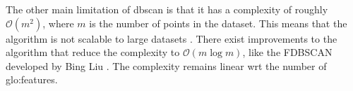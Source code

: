 The other main limitation of \gls{dbscan} is that it has a complexity of roughly $\mathcal{O}(m^2)$, where $m$ is the number of points in the dataset. This means that the algorithm is not scalable to large datasets . There exist improvements to the algorithm that reduce the complexity to $\mathcal{O}(m\log m)$, like the FDBSCAN developed by Bing Liu \cite{dbscanlogm}. The complexity remains linear \gls{wrt} the number of \gls{glo:feature}s.
